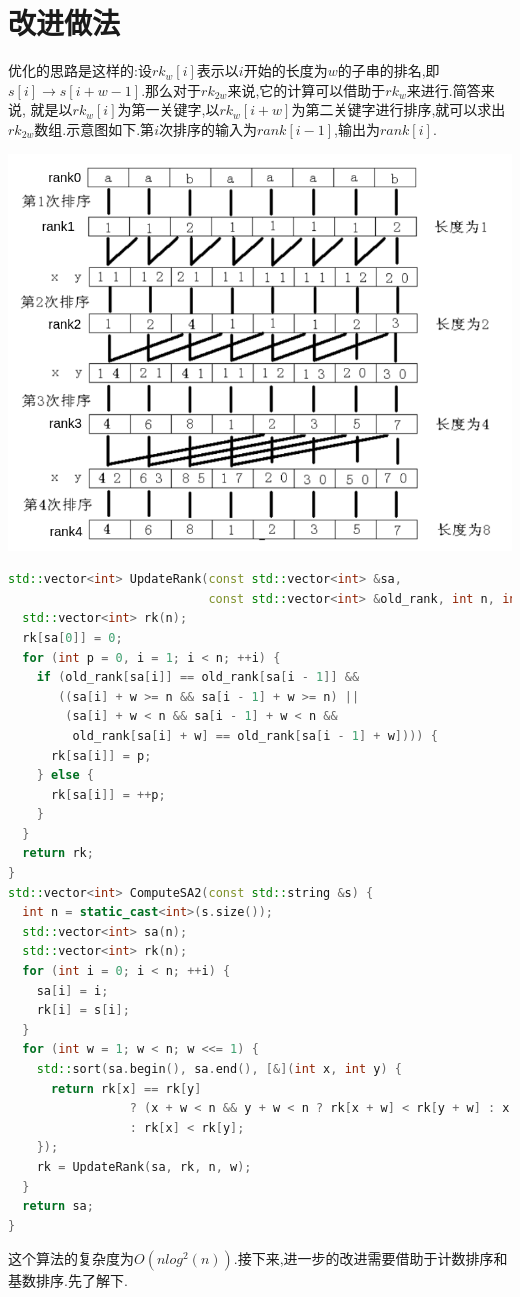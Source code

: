 \documentclass{article}
\begin{document}
\section{改进做法}
优化的思路是这样的:设$rk_{w}[i]$表示以$i$开始的长度为$w$的子串的排名,即$s[i]\rightarrow s[i+w-1]$.那么对于$rk_{2w}$来说,它的计算可以借助于$rk_{w}$来进行.简答来说, 就是以$rk_{w}[i]$为第一关键字,以$rk_{w}[i+w]$为第二关键字进行排序,就可以求出$rk_{2w}$数组.示意图如下.第$i$次排序的输入为$rank[i-1]$,输出为$rank[i]$. \par
\includegraphics[scale=0.4]{pic3.png} \par
\begin{lstlisting}[language=C++, caption={Better}]
std::vector<int> UpdateRank(const std::vector<int> &sa,
                            const std::vector<int> &old_rank, int n, int w) {
  std::vector<int> rk(n);
  rk[sa[0]] = 0;
  for (int p = 0, i = 1; i < n; ++i) {
    if (old_rank[sa[i]] == old_rank[sa[i - 1]] &&
       ((sa[i] + w >= n && sa[i - 1] + w >= n) ||
        (sa[i] + w < n && sa[i - 1] + w < n &&
         old_rank[sa[i] + w] == old_rank[sa[i - 1] + w]))) {
      rk[sa[i]] = p;
    } else {
      rk[sa[i]] = ++p;
    }
  }
  return rk;
}
std::vector<int> ComputeSA2(const std::string &s) {
  int n = static_cast<int>(s.size());
  std::vector<int> sa(n);
  std::vector<int> rk(n);
  for (int i = 0; i < n; ++i) {
    sa[i] = i;
    rk[i] = s[i];
  }
  for (int w = 1; w < n; w <<= 1) {
    std::sort(sa.begin(), sa.end(), [&](int x, int y) {
      return rk[x] == rk[y]
                 ? (x + w < n && y + w < n ? rk[x + w] < rk[y + w] : x + w >= n)
                 : rk[x] < rk[y];
    });
    rk = UpdateRank(sa, rk, n, w);
  }
  return sa;
}
\end{lstlisting}
这个算法的复杂度为$O(nlog^{2}(n))$.接下来,进一步的改进需要借助于计数排序和基数排序.先了解下.
\end{document}
